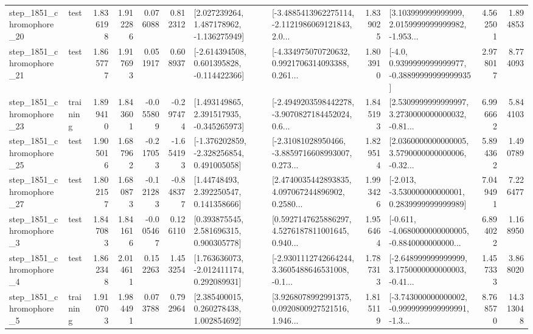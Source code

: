 \begin{tabular}{llrrrrllrlrr}
 step\_1851\_chromophore\_20 &      test &      1.836198 &    1.912286 &      0.076088 &  0.812312 &    [2.027239264, 1.487178962, -1.136275949] &  [-3.4885413962275114, -2.1121986069121843, 2.0... &       1.839025 &  [3.103999999999999, 2.0159999999999982, -1.953... &            4.562501 &          1.894853 \\
 step\_1851\_chromophore\_21 &      test &      1.865777 &    1.917693 &      0.051917 &  0.608937 &   [-2.614394508, 0.601395828, -0.114422366] &  [-4.334975070720632, 0.9921706314093388, 0.261... &       1.803910 &   [-4.0, 0.9399999999999977, -0.38899999999999935] &            2.978017 &          8.774093 \\
 step\_1851\_chromophore\_23 &  training &      1.899410 &    1.843601 &     -0.055809 & -0.297474 &    [1.493149865, 2.391517935, -0.345265973] &  [-2.4949203598442278, -3.9070827184452024, 0.6... &       1.845193 &  [2.5309999999999997, 3.2730000000000032, -0.81... &            6.996662 &          5.844103 \\
 step\_1851\_chromophore\_25 &      test &      1.905016 &    1.687962 &     -0.217053 & -1.654193 &   [-1.376202859, -2.328256854, 0.491005058] &  [-2.31081028950466, -3.8859716608993007, 0.273... &       1.829514 &  [2.0360000000000005, 3.5790000000000006, -0.32... &            5.894362 &          1.490789 \\
 step\_1851\_chromophore\_27 &      test &      1.802157 &    1.680873 &     -0.121283 & -0.848377 &      [1.44748493, 2.392250547, 0.141358666] &  [2.4740035442893835, 4.097067244896902, 0.2580... &       1.993426 &   [-2.013, -3.530000000000001, 0.2839999999999989] &            7.049491 &          7.226477 \\
  step\_1851\_chromophore\_3 &      test &      1.847083 &    1.841616 &     -0.005467 &  0.126110 &     [0.393875545, 2.581696315, 0.900305778] &  [0.5927147625886297, 4.5276187811001645, 0.940... &       1.956464 &  [-0.611, -4.0680000000000005, -0.8840000000000... &            6.894022 &          1.168950 \\
  step\_1851\_chromophore\_4 &      test &      1.862348 &    2.014611 &      0.152263 &  1.453254 &    [1.763636073, -2.012411174, 0.292089931] &  [-2.9301112742664244, 3.3605488646531008, -0.1... &       1.787313 &  [-2.648999999999999, 3.1750000000000003, -0.41... &            1.457333 &          3.868020 \\
  step\_1851\_chromophore\_5 &  training &      1.910703 &    1.984491 &      0.073788 &  0.792964 &     [2.385400015, 0.260278438, 1.002854692] &  [3.9268078992991375, 0.0920800927521516, 1.946... &       1.815119 &  [-3.743000000000002, -0.9999999999999991, -1.3... &            8.768570 &         14.313048 \\

\end{tabular}
